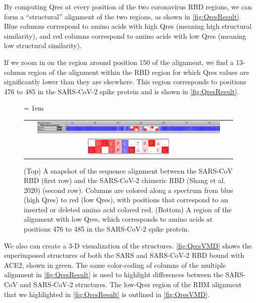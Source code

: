 By computing Qres at every position of the two coronavirus RBD regions, we can form a ``structural'' alignment of the two regions, as shown in \autoref{fig:QresResult}. Blue columns correspond to amino acids with high Qres (meaning high structural similarity), and red columns correspond to amino acids with low Qres (meaning low structural similarity).

If we zoom in on the region around position 150 of the alignment, we find a 13-column region of the alignment within the RBD region for which Qres values are significantly lower than they are elsewhere. This region corresponds to positions 476 to 485 in the SARS-CoV-2 spike protein and is shown in \autoref{fig:QresResult}.

\begin{figure}[h]
	\centering
	\tabcolsep = 1em
	\mySfFamily
	\begin{tabular}{c}
		\includegraphics[width = 0.9\textwidth]{../images/QresResult.png} \\
		\includegraphics[width = 0.4\textwidth]{../images/QresResult_cropped.png} \\
	\end{tabular}
	\caption{(Top) A snapshot of the sequence alignment between the SARS-CoV RBD (first row) and the SARS-CoV-2 chimeric RBD (Shang et al. 2020) (second row). Columns are colored along a spectrum from blue (high Qres) to red (low Qres), with positions that correspond to an inserted or deleted amino acid colored red. (Bottom) A region of the alignment with low Qres, which corresponds to amino acids at positions 476 to 485 in the SARS-CoV-2 spike protein.}
	\label{fig:QresResult}
\end{figure}

We also can create a 3-D visualization of the structures. \autoref{fig:QresVMD} shows the superimposed structures of both the SARS and SARS-CoV-2 RBD bound with ACE2, shown in green. The same color-coding of columns of the multiple alignment in \autoref{fig:QresResult} is used to highlight differences between the SARS-CoV and SARS-CoV-2 structures. The low-Qres region of the RBM alignment that we highlighted in \autoref{fig:QresResult} is outlined in \autoref{fig:QresVMD}.

